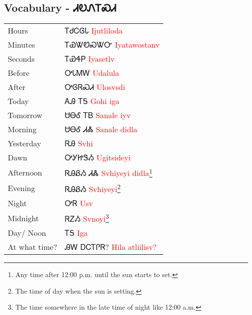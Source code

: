 \begin{multicols}
\subsection{Vocabulary - ᏗᎧᏁᎢᏍᏗ 
}
\begin{minipage}{\linewidth}
\begin{tabular}{p{5cm} p{9cm}}
Hours & ᎢᏧᏟᎶᏓ 
 \newline \textcolor{red}{Ijutliloda}\\
Minutes & ᎢᏯᏔᏬᏍᏔᏅ 
 \newline \textcolor{red}{Iyatawostanv}\\
Seconds & ᎢᏯᏎᏢ 
 \newline \textcolor{red}{Iyasetlv}\\
Before & ᎤᏓᎷᎳ 
 \newline \textcolor{red}{Udalula}\\
After & ᎤᎶᏒᏍᏗ 
 \newline \textcolor{red}{Ulosvsdi}\\
Today & ᎪᎯ ᎢᎦ 
 \newline \textcolor{red}{Gohi iga}\\
Tomorrow & ᏌᎾᎴ ᎢᏴ 
 \newline \textcolor{red}{Sanale iyv}\\
Morning & ᏌᎾᎴ ᏗᏜ 
 \newline \textcolor{red}{Sanale didla}\\
Yesterday & ᏒᎯ 
 \newline \textcolor{red}{Svhi}\\
Dawn & ᎤᎩᏥᏕᏱ 
 \newline \textcolor{red}{Ugitsideyi}\\
Afternoon & ᏒᎯᏰᏱ ᏗᏜ 
 \newline \textcolor{red}{Svhiyeyi didla}\footnote{Any time after 12:00 p.m. until the sun starts to set.}\\
Evening & ᏒᎯᏰᏱ 
 \newline \textcolor{red}{Svhiyeyi}\footnote{The time of day when the sun is setting.}\\
Night & ᎤᏒ 
 \newline \textcolor{red}{Usv}\\
Midnight & ᏒᏃᏱ 
 \newline \textcolor{red}{Svnoyi}\footnote{The time somewhere in the late time of night like 12:00 a.m.}\\
Day/ Noon & ᎢᎦ 
 \newline \textcolor{red}{Iga}\\
At what time? & ᎯᎳ ᎠᏟᎢᎵᏒ? 
 \newline \textcolor{red}{Hila atliilisv?}\\

\end{tabular}
\end{minipage}
\end{multicols}
